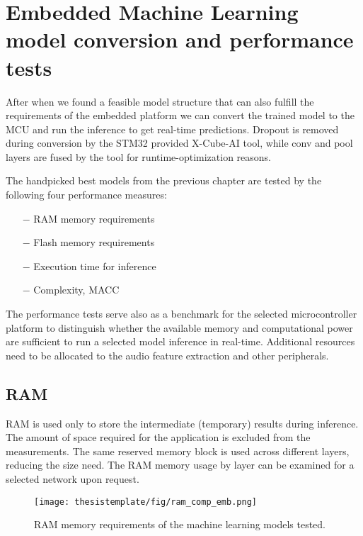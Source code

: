 \section{Embedded Machine Learning model conversion and performance tests}

After when we found a feasible model structure that can also fulfill the requirements of the embedded platform we can convert the trained model to the MCU and run the inference to get real-time predictions. Dropout is removed during conversion by the STM32 provided X-Cube-AI tool, while conv and pool layers are fused by the tool for runtime-optimization reasons.


The handpicked best models from the previous chapter are tested by the following four performance measures:
\begin{itemize}
    \item[$-$] RAM memory requirements
    \item[$-$] Flash memory requirements
    \item[$-$] Execution time for inference
    \item[$-$] Complexity, MACC 
\end{itemize}

The performance tests serve also as a benchmark for the selected microcontroller platform to distinguish whether the available memory and computational power are sufficient to run a selected model inference in real-time. Additional resources need to be allocated to the audio feature extraction and other peripherals.

\subsection{RAM}

RAM is used only to store the intermediate (temporary) results during inference. The amount of space required for the application is excluded from the measurements. The same reserved memory block is used across different layers, reducing the size need. The RAM memory usage by layer can be examined for a selected network upon request.

\begin{figure}[h!]
  \begin{center}
    \texttt{[image: thesistemplate/fig/ram\_comp\_emb.png]}
    \caption{RAM memory requirements of the machine learning models tested.}
    \label{fig:ram_comp_emb}
  \end{center}
\end{figure}

